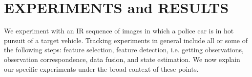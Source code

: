 \documentclass{article}
\begin{document}
%
%
%
%

\section{EXPERIMENTS and RESULTS}
We experiment with an IR sequence of images in which a police car is in hot pursuit of a target vehicle.  Tracking experiments in general include all or some of the following steps: feature selection, feature detection, i.e. getting observations, observation correspondence, data fusion, and state estimation.  We now explain our specific experiments under the broad context of these points.
\end{document}
